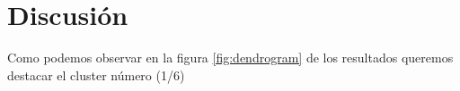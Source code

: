 \section{Discusión}

Como podemos observar en la figura \ref{fig:dendrogram} de los resultados queremos destacar el cluster número (1/6)
